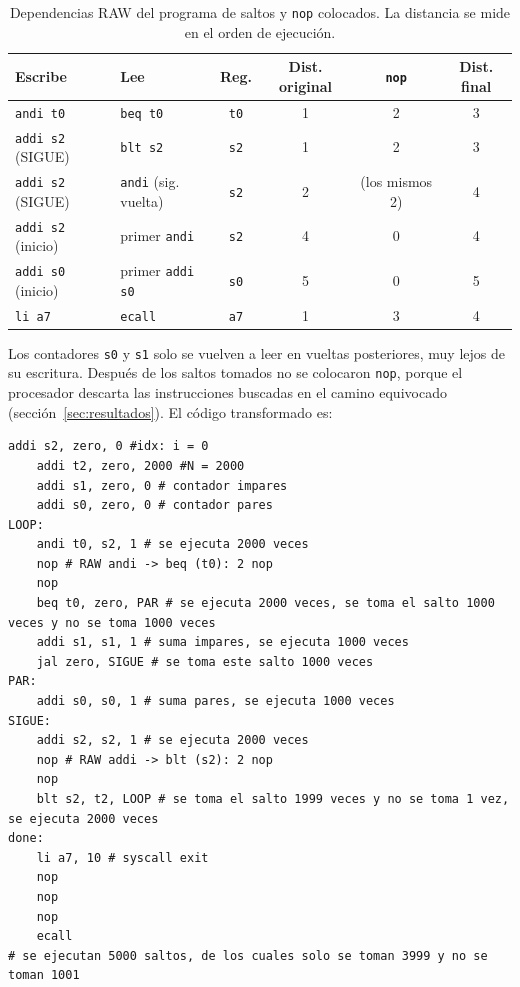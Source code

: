 \documentclass[11pt,a4paper]{article}
\begin{document}
\begin{table}[h]
  \centering
  \small
  \begin{tabular}{@{}llcccc@{}}
    \toprule
    Escribe & Lee & Reg. & Dist. original & \texttt{nop} & Dist. final \\
    \midrule
    \texttt{andi t0}          & \texttt{beq t0}                & \texttt{t0} & 1 & 2 & 3 \\
    \texttt{addi s2} (SIGUE)  & \texttt{blt s2}                & \texttt{s2} & 1 & 2 & 3 \\
    \texttt{addi s2} (SIGUE)  & \texttt{andi} (sig. vuelta)    & \texttt{s2} & 2 & (los mismos 2) & 4 \\
    \texttt{addi s2} (inicio) & primer \texttt{andi}           & \texttt{s2} & 4 & 0 & 4 \\
    \texttt{addi s0} (inicio) & primer \texttt{addi s0}        & \texttt{s0} & 5 & 0 & 5 \\
    \texttt{li a7}            & \texttt{ecall}                 & \texttt{a7} & 1 & 3 & 4 \\
    \bottomrule
  \end{tabular}
  \caption{Dependencias RAW del programa de saltos y \texttt{nop} colocados. La
  distancia se mide en el orden de ejecuci\'on.}
  \label{tab:dependencias2}
\end{table}
 
Los contadores \texttt{s0} y \texttt{s1} solo se vuelven a leer en vueltas
posteriores, muy lejos de su escritura. Despu\'es de los saltos tomados no se
colocaron \texttt{nop}, porque el procesador descarta las instrucciones buscadas
en el camino equivocado (secci\'on~\ref{sec:resultados}). El c\'odigo
transformado es:
 
\begin{lstlisting}[style=asm,caption={Versi\'on con \texttt{nop} para el procesador sin forwarding ni detecci\'on de hazards.},label={lst:saltos_nops}]
    addi s2, zero, 0 #idx: i = 0
    addi t2, zero, 2000 #N = 2000
    addi s1, zero, 0 # contador impares
    addi s0, zero, 0 # contador pares
LOOP:
    andi t0, s2, 1 # se ejecuta 2000 veces
    nop # RAW andi -> beq (t0): 2 nop
    nop
    beq t0, zero, PAR # se ejecuta 2000 veces, se toma el salto 1000 veces y no se toma 1000 veces
    addi s1, s1, 1 # suma impares, se ejecuta 1000 veces
    jal zero, SIGUE # se toma este salto 1000 veces
PAR:
    addi s0, s0, 1 # suma pares, se ejecuta 1000 veces
SIGUE:
    addi s2, s2, 1 # se ejecuta 2000 veces
    nop # RAW addi -> blt (s2): 2 nop
    nop
    blt s2, t2, LOOP # se toma el salto 1999 veces y no se toma 1 vez, se ejecuta 2000 veces
done:
    li a7, 10 # syscall exit
    nop
    nop
    nop
    ecall
# se ejecutan 5000 saltos, de los cuales solo se toman 3999 y no se toman 1001
\end{lstlisting}
 
\end{document}

